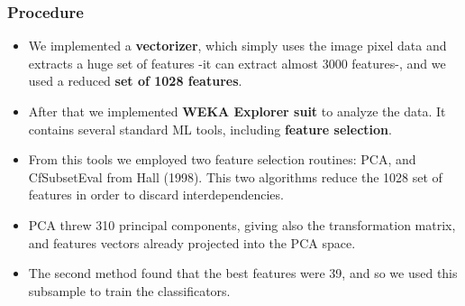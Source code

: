 \documentclass[10pt]{beamer}
\begin{document}
\begin{frame}\frametitle{Procedure}
\begin{itemize}[<+->]
 \item We implemented a \textbf{vectorizer}, which simply uses the image pixel data
and extracts a huge set of features -it can extract almost 3000 features-, 
and we used a reduced \textbf{set of 1028 features}.
 \item After that we implemented \textbf{WEKA Explorer suit} to analyze the data.
It contains several standard ML tools, including \textbf{feature selection}.
 \item From this tools we employed two feature selection routines: PCA, and 
CfSubsetEval from Hall (1998). This two algorithms reduce the 1028
set of features in order to discard interdependencies.
 \item PCA threw 310 principal components, giving also the transformation matrix, and
features vectors already projected into the PCA space.
 \item The second method found that the best features were 39, and so we used this subsample to 
train the classificators.
\end{itemize}
\end{frame}
\end{document}
